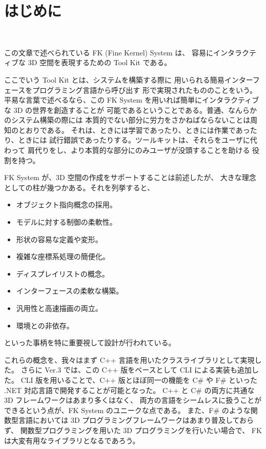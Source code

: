 \chapter*{はじめに}
~

この文章で述べられている FK (Fine Kernel)  System は、
容易にインタラクティブな 3D 空間を表現するための Tool Kit である。

ここでいう Tool Kit とは、システムを構築する際に
用いられる簡易インターフェースをプログラミング言語から呼び出す
形で実現されたもののことをいう。平易な言葉で述べるなら、この
FK System を用いれば簡単にインタラクティブな 3D の世界を創造することが
可能であるということである。普通、なんらかのシステム構築の際には
本質的でない部分に労力をさかねばならないことは周知のとおりである。
それは、ときには学習であったり、ときには作業であったり、ときには
試行錯誤であったりする。ツールキットは、それらをユーザに代わって
肩代りをし、より本質的な部分にのみユーザが没頭することを助ける
役割を持つ。

FK System が、3D 空間の作成をサポートすることは前述したが、
大きな理念としての柱が幾つかある。それを列挙すると、
\begin{itemize}
 \item オブジェクト指向概念の採用。
 \item モデルに対する制御の柔軟性。
 \item 形状の容易な定義や変形。
 \item 複雑な座標系処理の簡便化。
 \item ディスプレイリストの概念。
 \item インターフェースの柔軟な構築。
 \item 汎用性と高速描画の両立。
 \item 環境との非依存。
\end{itemize}
といった事柄を特に重要視して設計が行われている。

これらの概念を、我々はまず C++ 言語を用いたクラスライブラリとして実現した。
さらに Ver.3 では、この C++ 版をベースとして CLI による実装も追加した。
CLI 版を用いることで、C++ 版とほぼ同一の機能を C\# や F\# といった
.NET 対応言語で開発することが可能となった。
C++ と C\# の両方に共通な 3D フレームワークはあまり多くはなく、
両方の言語をシームレスに扱うことができるという点が、FK System のユニークな点である。
また、F\# のような関数型言語においては 3D プログラミングフレームワークはあまり普及しておらず、
関数型プログラミングを用いた 3D プログラミングを行いたい場合で、
FK は大変有用なライブラリとなるであろう。

